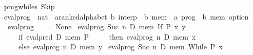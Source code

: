 \begin{isabellebody}
{}\ {}prog{}whiles\ Skip\ {}\ {}{}{}\isanewline
\isanewline
{}\isamarkupfalse%
\ eval{}prog\ {}{}\ {}nat\ {}\ {}{}a{}{}ranked{}alphabet{}\ {}b{}\ interp\ {}\ {}b\ mem\ {}\ {}a\ prog\ {}\ {}b\ mem\ option{}\ \isanewline
\ \ {}eval{}prog\ {}\ {}\ {}\ {}\ {}\ None{}\isanewline
{}\ {}eval{}prog\ {}Suc\ n{}\ D\ mem\ {}If\ P\ x\ y{}\ {}\isanewline
\ \ \ \ \ {}if\ eval{}pred\ D\ mem\ P\isanewline
\ \ \ \ \ then\ eval{}prog\ n\ D\ mem\ x\isanewline
\ \ \ \ \ else\ eval{}prog\ n\ D\ mem\ y{}{}\isanewline
{}\ {}eval{}prog\ {}Suc\ n{}\ D\ mem\ {}While\ P\ x{}\ {}\isanewline

\end{isabellebody}
